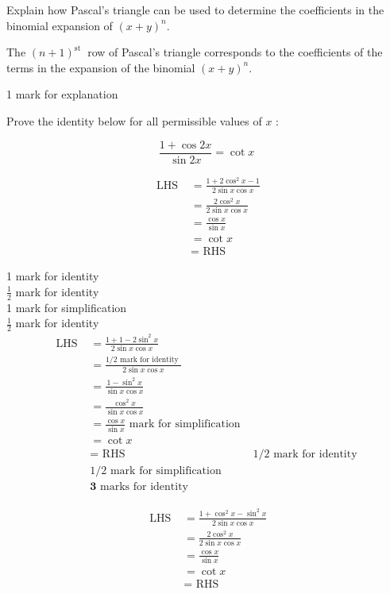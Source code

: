 \documentclass[12pt,addpoints]{exam}
\begin{document}
\begin{questions}
\question[1]
Explain how Pascal's triangle can be used to determine the coefficients in the binomial expansion of $(x+y)^{n}$.

\begin{solution}
The $(n+1)^{\text {st }}$ row of Pascal's triangle corresponds to the coefficients of the terms in the expansion of the binomial $(x+y)^{n}$.

1 mark for explanation\\
\end{solution}

\question[3]
Prove the identity below for all permissible values of $x$ :

$$
\frac{1+\cos 2 x}{\sin 2 x}=\cot x
$$

\begin{solution}
$$
\begin{aligned}
\text { LHS } & =\frac{1+2 \cos ^{2} x-1}{2 \sin x \cos x} \\
& =\frac{2 \cos ^{2} x}{2 \sin x \cos x} \\
& =\frac{\cos x}{\sin x} \\
& =\cot x \\
& =\text { RHS }
\end{aligned}
$$

1 mark for identity\\
$\frac{1}{2}$ mark for identity\\
1 mark for simplification\\
$\frac{1}{2}$ mark for identity\\

$$
\begin{array}{rlr}
\text { LHS } & =\frac{1+1-2 \sin ^{2} x}{2 \sin x \cos x} & \\
& =\frac{1 / 2 \text { mark for identity }}{2 \sin x \cos x} & \\
& =\frac{1-\sin ^{2} x}{\sin x \cos x} & \\
& =\frac{\cos ^{2} x}{\sin x \cos x} & \\
& =\frac{\cos x}{\sin x} \text { mark for simplification } \\
& =\cot x & \\
& =\text { RHS } & 1 / 2 \text { mark for identity } \\
& 1 / 2 \text { mark for simplification } \\
& \mathbf{3} \text { marks for identity }
\end{array}
$$



$$
\begin{aligned}
\text { LHS } & =\frac{1+\cos ^{2} x-\sin ^{2} x}{2 \sin x \cos x} \\
& =\frac{2 \cos ^{2} x}{2 \sin x \cos x} \\
& =\frac{\cos x}{\sin x} \\
& =\cot x \\
& =\text { RHS }
\end{aligned}
$$


\end{solution}
\end{questions}
\end{document}
